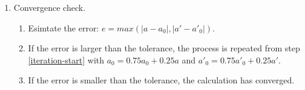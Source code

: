 \begin{enumerate}
	\item Convergence check.
	
	\begin{enumerate}
		
		\item Esimtate the error: $ e = max(|a-a_0|, |a'-a'_0|) $.
		
		\item If the error is larger than the tolerance, the process is repeated from step \ref{iteration-start} with $ a_0 = 0.75 a_0 + 0.25 a $ and $ a'_0 = 0.75 a'_0 + 0.25 a' $.
		
		\item If the error is smaller than the tolerance, the calculation has converged.
		
	\end{enumerate}
	
\end{enumerate}
